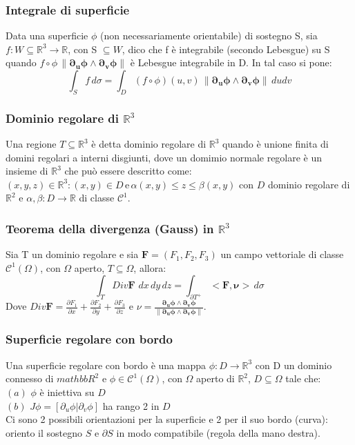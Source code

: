 \documentclass{article} %
\begin{document}
    \subsubsection*{Integrale di superficie}
    Data una superficie $\phi$ (non necessariamente orientabile) di sostegno S, sia $f: W \subseteq \mathbb{R}^3 \to \mathbb{R}$, con S $\subseteq W$, dico che f è integrabile (secondo Lebesgue) su S quando $f \circ \phi \, \lVert \mathbf{ \partial_u \phi \wedge \partial_v \phi} \rVert$ è Lebesgue integrabile in D. In tal caso si pone: 
    $$\int_S f \, d \sigma = \int_D (f \circ \phi) (u,v) \, \lVert \mathbf{ \partial_u \phi \wedge \partial_v \phi} \rVert \, du dv $$

    \subsubsection*{Dominio regolare di $\mathbb{R}^3$}
    Una regione $T \subseteq \mathbb{R}^3$ è detta dominio regolare di $\mathbb{R}^3$ quando è unione finita di domini regolari a interni disgiunti, dove un domimio normale regolare è un insieme di $\mathbb{R}^3$ che può essere descritto come: \\
    ${(x,y,z) \in \mathbb{R}^3 : (x,y) \in D \, \text{e} \, \alpha(x,y) \leq z \leq \beta(x,y)}$ con $D$ dominio regolare di $\mathbb{R}^2$ e $\alpha, \beta: D \to \mathbb{R}$ di classe $\mathcal{C}^1$. 

    \subsubsection*{Teorema della divergenza (Gauss) in $\mathbb{R}^3$}
    Sia T un dominio regolare e sia $\mathbf{F}=(F_1, F_2, F_3)$ un campo vettoriale di classe $\mathcal{C}^1(\Omega)$, con $\Omega$ aperto, $T \subseteq \Omega$, allora:
    $$\int_T Div \mathbf{F} \,\, dx \, dy \, dz = \int_{\partial T^+} <\mathbf{F}, \mathbf{\nu}> \, d\sigma$$
    Dove $ Div \mathbf{F} = \frac{\partial F_1}{\partial x} + \frac{\partial F_2}{\partial y} + \frac{\partial F_3}{\partial z}$ e $\nu = \frac{ \mathbf{ \partial_u \phi \wedge \partial_v \phi}}{\lVert \mathbf{ \partial_u \phi \wedge \partial_v \phi} \rVert}$.

    \subsubsection*{Superficie regolare con bordo}
    Una superficie regolare con bordo è una mappa $\phi:D \to \mathbb{R}^3$ con D un dominio connesso di $mathbb{R}^2$ e $\phi \in \mathcal{C}^1 (\Omega)$, con $\Omega$ aperto di $\mathbb{R}^2$, $D \subseteq \Omega$ tale che: \\
    $(a)$ $\phi$ è iniettiva su $D$ \\
    $(b)$ $J \phi = \left[ \partial_u \phi | \partial_v \phi \right]$ ha rango 2 in $D$ \\
    Ci sono 2 possibili orientazioni per la superficie e 2 per il suo bordo (curva): oriento il sostegno $S$ e $\partial S$ in modo compatibile (regola della mano destra).
\end{document}
